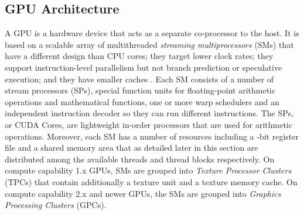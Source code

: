 \documentclass{ws-ijait}
\begin{document}
\subsection{GPU Architecture}
\label{sec:GPU-Architecture}

A GPU is a hardware device that acts as a separate co-processor to the host. It is based on a scalable array of multithreaded \textit{streaming multiprocessors} (SMs) that have a different design than CPU cores; they target lower clock rates; they support instruction-level parallelism but not branch prediction or speculative execution; and they have smaller caches \cite{Wilt2013}. Each SM consists of a number of stream processors (SPs), special function units for floating-point arithmetic operations and mathematical functions, one or more warp schedulers and an independent instruction decoder so they can run different instructions. The SPs, or CUDA Cores, are lightweight in-order processors that are used for arithmetic operations. Moreover, each SM has a number of resources including a -bit register file and a shared memory area that as detailed later in this section are distributed among the available threads and thread blocks respectively. On compute capability 1.x GPUs, SMs are grouped into \textit{Texture Processor Clusters} (TPCs) that contain additionally a texture unit and a texture memory cache. On compute capability 2.x and newer GPUs, the SMs are grouped into \textit{Graphics Processing Clusters} (GPCs).
\end{document}
